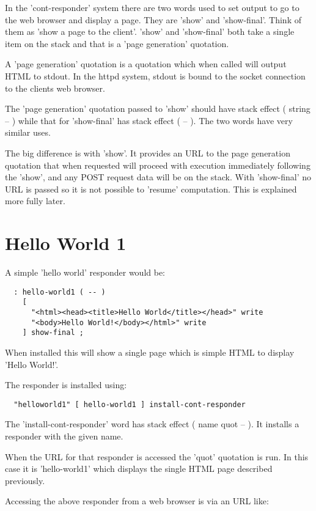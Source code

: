 In the 'cont-responder' system there are two words used to set output
to go to the web browser and display a page. They are 'show' and
'show-final'. Think of them as 'show a page to the client'. 'show' and
'show-final' both take a single item on the stack and that is a 'page
generation' quotation.

A 'page generation' quotation is a quotation which when called will
output HTML to stdout. In the httpd system, stdout is bound to the
socket connection to the clients web browser. 

The 'page generation' quotation passed to 'show' should have stack
effect ( string -- ) while that for 'show-final' has stack effect 
( -- ). The two words have very similar uses. 

The big difference is with 'show'. It provides an URL to the page
generation quotation that when requested will proceed with execution
immediately following the 'show', and any POST request data will be on
the stack. With 'show-final' no URL is passed so it is not possible to
'resume' computation. This is explained more fully later.

\section{Hello World 1}
A simple 'hello world' responder would be:

\begin{verbatim}
  : hello-world1 ( -- )
    [
      "<html><head><title>Hello World</title></head>" write
      "<body>Hello World!</body></html>" write
    ] show-final ;
\end{verbatim}

When installed this will show a single page which is simple HTML to
display 'Hello World!'. 

The responder is installed using:

\begin{verbatim}
  "helloworld1" [ hello-world1 ] install-cont-responder
\end{verbatim}

The 'install-cont-responder' word has stack effect 
( name quot -- ). It installs a responder with the given name. 

When the URL for that responder is accessed the 'quot' quotation is
run. In this case it is 'hello-world1' which displays the single HTML
page described previously.

Accessing the above responder from a web browser is via an URL like:

